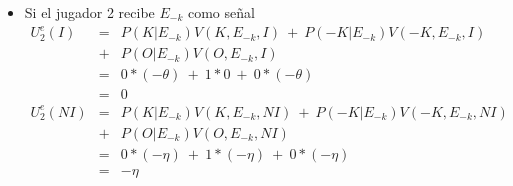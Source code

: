 {\begin{enumerate}
\begin{enumerate}
\begin{enumerate}
\begin{itemize}
\begin{eqnarray*}
                U_{2}^{e}(I)&=&P(K|E_k)V(K,E_k,I)\ +\ P(-K|E_k)V(-K,E_k,I)\\
                            &+&P(O|E_k)V(O,E_k,I)\\
                            &=&0.98*0\ +\ 0*(-\theta)\ + \ 0.02*(-\theta)\\
                            &=&0.02*(-\theta)\\
                U_{2}^{e}(NI)&=&P(K|E_k)V(K,E_k,NI)\ +\ P(-K|E_k)V(-K,E_k,NI)\\ 
                             &+&P(O|E_k)V(O,E_k,NI)\\
                             &=&0.98*(-\eta)\ +\ 0*(-\eta)\ + \ 0.02*(-\eta)\\
                             &=&-\eta
            \end{eqnarray*}

            La mejor respuesta del jugador 2 si recibe un señal $E_k$ es:
            \begin{equation*}
                \gamma_2(E_k)=
                \begin{cases}
                    I \text{ si } \eta \geq 0.02\theta \\
                    NI \text{ si } \eta < 0.02\theta \\
                \end{cases}    
               \end{equation*}
                
        \item Si el jugador 2 recibe $E_{-k}$ como señal
            \begin{eqnarray*}
                U_{2}^{e}(I)&=&P(K|E_{-k})V(K,E_{-k},I)\ +\ P(-K|E_{-k})V(-K,E_{-k},I)\\ 
                            &+&P(O|E_{-k})V(O,E_{-k},I)\\
                            &=&0*(-\theta)\ +\ 1*0\ + \ 0*(-\theta)\\
                            &=&0\\
                U_{2}^{e}(NI)&=&P(K|E_{-k})V(K,E_{-k},NI)\ +\ P(-K|E_{-k})V(-K,E_{-k},NI)\\
                             &+&P(O|E_{-k})V(O,E_{-k},NI)\\
                             &=&0*(-\eta)\ +\ 1*(-\eta)\ + \ 0*(-\eta)\\
                             &=&-\eta
            \end{eqnarray*}


\end{itemize}
\end{enumerate}
\end{enumerate}
\end{enumerate}}

